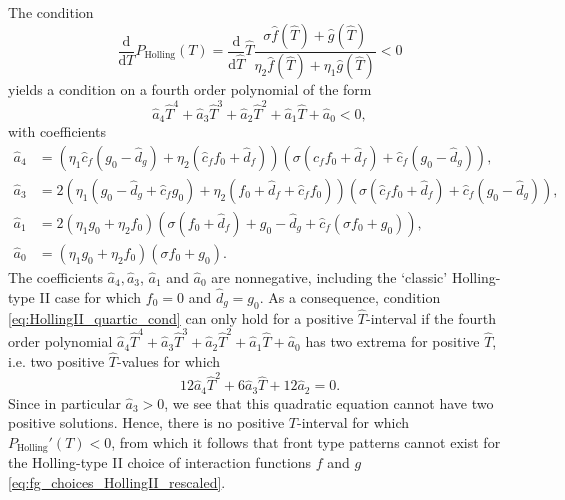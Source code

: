\documentclass[a4paper,10pt,abstract=true,parskip=true]{scrartcl}
\theoremstyle{remark}
\numberwithin{equation}{section}
\numberwithin{thm}{section}
\begin{document}
The condition
\begin{displaymath}
    \frac{\text{d}}{\text{d} T} P_\text{Holling}(T) = \frac{\text{d}}{\text{d} \hat{T}} \hat{T} \frac{\sigma \hat{f}(\hat{T}) +\hat{g}(\hat{T})}{\eta_2 \hat{f}(\hat{T}) + \eta_1\hat{g}(\hat{T})} < 0
\end{displaymath}
yields a condition on a fourth order polynomial of the form
\begin{equation}\label{eq:HollingII_quartic_cond}
    \hat{a}_4 \hat{T}^4 + \hat{a}_3 \hat{T}^3 + \hat{a}_2 \hat{T}^2 + \hat{a}_1 \hat{T} + \hat{a}_0 < 0,
\end{equation}
with coefficients
\begin{subequations}
    \begin{align}
    \hat{a}_4 &= \left(\eta_1 \hat{c}_f(g_0 - \hat{d}_g) + \eta_2 (\hat{c}_f f_0 + \hat{d}_f)\right) \left(\sigma(\hat{c}_f f_0 + \hat{d}_f) + \hat{c}_f(g_0 - \hat{d}_g)\right),\\
    \hat{a}_3 &= 2 \left(\eta_1(g_0 - \hat{d}_g + \hat{c}_f g_0) +\eta_2(f_0 + \hat{d}_f + \hat{c}_f f_0)\right)\left(\sigma (\hat{c}_f f_0 + \hat{d}_f) +\hat{c}_f(g_0- \hat{d}_g)\right),\\
    \hat{a}_1 &= 2 \left(\eta_1 g_0 + \eta_2 f_0\right)\left(\sigma(f_0 + \hat{d}_f) + g_0 - \hat{d}_g + \hat{c}_f(\sigma f_0 + g_0)\right),\\
    \hat{a}_0 &= \left(\eta_1 g_0 + \eta_2 f_0\right)\left(\sigma f_0 + g_0\right).
    \end{align}
\end{subequations}
The coefficients $\hat{a}_4, \hat{a}_3$, $\hat{a}_1$ and $\hat{a}_0$ are nonnegative, including the `classic' Holling-type II case for which $f_0 = 0$ and $\hat{d}_g = g_0$. As a consequence, condition \eqref{eq:HollingII_quartic_cond} can only hold for a positive $\hat{T}$-interval if the fourth order polynomial $\hat{a}_4\hat{T}^4 + \hat{a}_3 \hat{T}^3 + \hat{a}_2 \hat{T}^2 + \hat{a}_1 \hat{T} + \hat{a}_0$ has two extrema for positive $\hat{T}$, i.e. two positive $\hat{T}$-values for which
\begin{displaymath}
    12 \hat{a}_4\hat{T}^2 + 6 \hat{a}_3 \hat{T} + 12 \hat{a}_2 = 0.
\end{displaymath}
Since in particular $\hat{a}_3>0$, we see that this quadratic equation cannot have two positive solutions. Hence, there is no positive $T$-interval for which $P_\text{Holling}'(T) < 0$, from which it follows that front type patterns cannot exist for the Holling-type II choice of interaction functions $f$ and $g$ \eqref{eq:fg_choices_HollingII_rescaled}.\\
\end{document}
